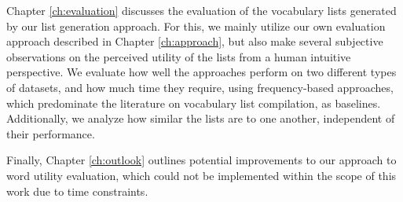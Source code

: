 Chapter \ref{ch:evaluation} discusses the evaluation of the vocabulary lists generated by our list generation approach.
For this, we mainly utilize our own evaluation approach described in Chapter \ref{ch:approach}, but also make several subjective observations on the perceived utility of the lists from a human intuitive perspective.
We evaluate how well the approaches perform on two different types of datasets, and how much time they require, using frequency-based approaches, which predominate the literature on vocabulary list compilation, as baselines.
Additionally, we analyze how similar the lists are to one another, independent of their performance.

Finally, Chapter \ref{ch:outlook} outlines potential improvements to our approach to word utility evaluation, which could not be implemented within the scope of this work due to time constraints.





